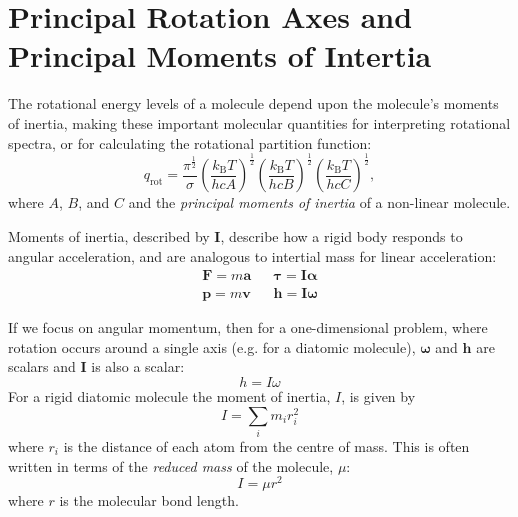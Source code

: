 \documentclass[a4paper]{article}
\newcommand{\bvec}[1]{\boldsymbol{\mathbf{#1}}}
\begin{document}
\section{Principal Rotation Axes and Principal Moments of Intertia}
The rotational energy levels of a molecule depend upon the molecule's moments of inertia, making these important molecular quantities for interpreting rotational spectra, or for calculating the rotational partition function:
\begin{equation}
q_\mathrm{rot} = \frac{\pi^{\frac{1}{2}}}{\sigma}\left(\frac{k_\mathrm{B}T}{hcA}\right)^\frac{1}{2}\left(\frac{k_\mathrm{B}T}{hcB}\right)^\frac{1}{2}\left(\frac{k_\mathrm{B}T}{hcC}\right)^\frac{1}{2},
\end{equation}
where $A$, $B$, and $C$ and the \emph{principal moments of inertia} of a non-linear molecule.

Moments of inertia, described by $\bvec{I}$, describe how a rigid body responds to angular acceleration, and are analogous to intertial mass for linear acceleration:
\begin{align*}
\bvec{F} = m\bvec{a} && \bvec{\tau} = \bvec{I} \bvec{\alpha} \\
\bvec{p} = m\bvec{v} && \bvec{h}    = \bvec{I}\bvec{\omega} 
\end{align*}

If we focus on angular momentum, then for a one-dimensional problem, where rotation occurs around a single axis (e.g. for a diatomic molecule), $\bvec{\omega}$ and $\bvec{h}$ are scalars and $\bvec{I}$ is also a scalar:
\begin{equation*}
h = I\omega
\end{equation*}
For a rigid diatomic molecule the moment of inertia, $I$, is given by
\begin{equation*}
I = \sum_i m_i r_i^2
\end{equation*}
where $r_i$ is the distance of each atom from the centre of mass. This is often written in terms of the \emph{reduced mass} of the molecule, $\mu$:
\begin{equation*}
I = \mu r^2
\end{equation*}
where $r$ is the molecular bond length.
\end{document}
